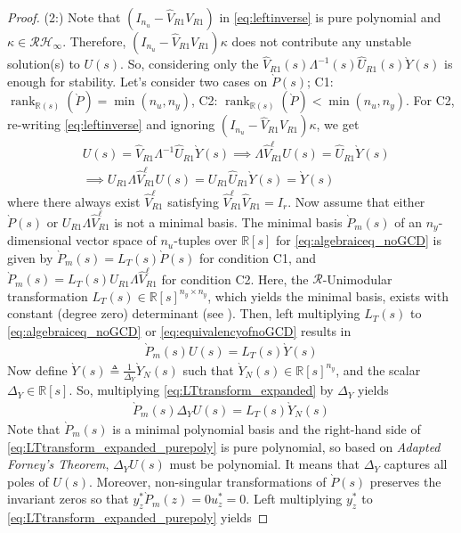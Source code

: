 \documentclass[journal]{IEEEtran}
\theoremstyle{remark}
\DeclareMathOperator*{\rank}{rank}
\begin{document}
\begin{proof}
(2:) Note that $(I_{n_u}-\hat{V}_{R1}{V}_{R1})$ in \eqref{eq:leftinverse} is pure polynomial and $\kappa \in \mathcal{R}\mathcal{H}_\infty$. Therefore, $(I_{n_u}-\hat{V}_{R1}{V}_{R1})\kappa$ does not contribute any unstable solution(s) to $U(s)$. So, considering only the $\hat{V}_{R1}(s)\Lambda^{-1}(s)\hat{U}_{R1}(s)\grave{Y}(s)$ is enough for stability. Let's consider two cases on $\grave{P}(s)$; C1: $\rank_{\mathbb{R}(s)}(\grave{P})=\min(n_u,n_y)$, C2: $\rank_{\mathbb{R}(s)}(\grave{P})<\min(n_u,n_y)$. 
For C2, re-writing \eqref{eq:leftinverse} and ignoring $(I_{n_u}-\hat{V}_{R1}{V}_{R1})\kappa$, we get
\begin{align}
    &U(s)=\hat{V}_{R1}\Lambda^{-1}\hat{U}_{R1}\grave{Y}(s) \implies
    \Lambda\hat{V}^\ell_{R1}U(s)=\hat{U}_{R1}\grave{Y}(s)\nonumber \\
    &\implies U_{R1}\Lambda\hat{V}^\ell_{R1} U(s)=U_{R1}\hat{U}_{R1}\grave{Y}(s) = \grave{Y}(s) \label{eq:equivalencyofnoGCD}
\end{align}
where there always exist $\hat{V}^\ell_{R1}$ satisfying $\hat{V}^\ell_{R1}\hat{V}_{R1}=I_r$. Now assume that either $\grave{P}(s)$ or $U_{R1}\Lambda\hat{V}_{R1}^\ell$ is not a minimal basis. The minimal basis \( \grave{P}_m(s) \) of an \( n_y \)-dimensional vector space of \( n_u \)-tuples over \( \mathbb{R}[s] \) for \eqref{eq:algebraiceq_noGCD} is given by \( \grave{P}_m(s) = L_T(s)\grave{P}(s) \) for condition C1, and \( \grave{P}_m(s) = L_T(s)U_{R1}\Lambda\hat{V}_{R1}^\ell \) for condition C2. Here, the \( \mathcal{R}\)-Unimodular transformation \( L_T(s) \in \mathbb{R}[s]^{n_y \times n_y} \), which yields the minimal basis, exists with constant (degree zero) determinant (see \cite[Remark 2]{forney1975minimal}). Then, left multiplying $L_T(s)$ to \eqref{eq:algebraiceq_noGCD} or \eqref{eq:equivalencyofnoGCD} results in
\begin{align} \label{eq:LTtransform_expanded}
 \grave{P}_m(s)U(s)=L_T(s)\grave{Y}(s)
\end{align}
\noindent Now define $\grave{Y}(s) \triangleq \frac{1}{\Delta_Y}{\grave{Y}_N}(s)$ such that $\grave{Y}_N(s) \in \mathbb{R}[s]^{n_y}$, and the scalar $\Delta_Y \in \mathbb{R}[s]$. So, multiplying \eqref{eq:LTtransform_expanded} by $\Delta_Y$ yields
\begin{align} \label{eq:LTtransform_expanded_purepoly}
\grave{P}_m(s)\Delta_YU(s)=L_T(s)\grave{Y}_N(s)
\end{align}
Note that $\grave{P}_m(s)$ is a minimal polynomial basis and the right-hand side of \eqref{eq:LTtransform_expanded_purepoly} is pure polynomial, so based on \textit{Adapted Forney's Theorem}, $\Delta_YU(s)$ must be polynomial. It means that $\Delta_Y$ captures all poles of $U(s)$. Moreover, non-singular transformations of $\grave{P}(s)$ preserves the invariant zeros \cite{misra1994computation} so that $y^*_z\grave{P}_m(z)=0u^*_z=0$. Left multiplying $y^*_z$ to \eqref{eq:LTtransform_expanded_purepoly} yields

\end{proof}
\end{document}
